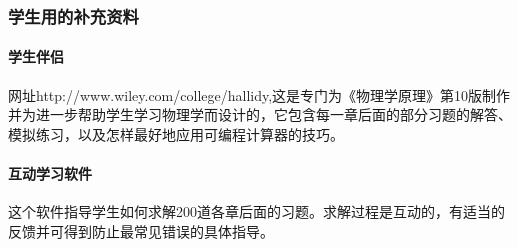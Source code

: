 \subsubsection*{学生用的补充资料}
\paragraph{学生伴侣}网址http://www.wiley.com/college/hallidy,这是专门为《物理学原理》第10版制作并为进一步帮助学生学习物理学而设计的，它包含每一章后面的部分习题的解答、模拟练习，以及怎样最好地应用可编程计算器的技巧。

\paragraph{互动学习软件}这个软件指导学生如何求解200道各章后面的习题。求解过程是互动的，有适当的反馈并可得到防止最常见错误的具体指导。


















